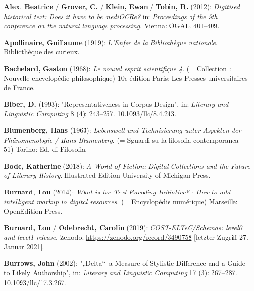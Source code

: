 \documentclass[
  12pt,
  letterpaper,
  DIV=11,
  numbers=noendperiod]{scrreprt}
\newlength{\cslhangindent}
\newenvironment{CSLReferences}[2] %
 {\begin{list}{}{%
  \setlength{\itemindent}{0pt}
  \setlength{\leftmargin}{0pt}
  \setlength{\parsep}{0pt}
  \ifodd #1
   \setlength{\leftmargin}{\cslhangindent}
   \setlength{\itemindent}{-1\cslhangindent}
  \fi
  \setlength{\itemsep}{#2\baselineskip}}}
 {\end{list}}
\begin{document}
\label{refs}
\begin{CSLReferences}{1}{0}
\textbf{Alex, Beatrice} / \textbf{Grover, C.} / \textbf{Klein, Ewan} /
\textbf{Tobin, R.} (2012): \emph{Digitised historical text: {Does} it
have to be {mediOCRe}?} in: \emph{Proceedings of the 9th conference on
the natural language processing}. Vienna: ÖGAL. 401--409.

\textbf{Apollinaire, Guillaume} (1919):
\emph{\href{https://fr.wikisource.org/wiki/Livre:Apollinaire_-_L\%E2\%80\%99Enfer_de_la_Biblioth\%C3\%A8que_nationale.djvu}{L'{Enfer}
de la {Bibliothèque} nationale}}. Bibliothèque des curieux.

\textbf{Bachelard, Gaston} (1968): \emph{Le nouvel esprit scientifique
4}. (= Collection : {Nouvelle} encyclopédie philosophique) 10e édition
Paris: Les Presses universitaires de France.

\textbf{Biber, D.} (1993): "Representativeness in {Corpus} {Design}",
in: \emph{Literary and Linguistic Computing} 8 (4): 243--257.
\href{https://doi.org/10.1093/llc/8.4.243}{10.1093/llc/8.4.243}.

\textbf{Blumenberg, Hans} (1963): \emph{Lebenswelt und {Technisierung}
unter {Aspekten} der {Phänomenologie} / {Hans} {Blumenberg}}. (= Sguardi
su la filosofia contemporanea 51) Torino: Ed. di Filosofia.

\textbf{Bode, Katherine} (2018): \emph{A {World} of {Fiction}: {Digital}
{Collections} and the {Future} of {Literary} {History}}. Illustrated
Edition University of Michigan Press.

\textbf{Burnard, Lou} (2014):
\emph{\href{http://books.openedition.org/oep/426}{What is the {Text}
{Encoding} {Initiative}? : {How} to add intelligent markup to digital
resources}}. (= Encyclopédie numérique) Marseille: OpenEdition Press.

\textbf{Burnard, Lou} / \textbf{Odebrecht, Carolin} (2019):
\emph{{COST}-{ELTeC}/{Schemas}: level0 and level1 release}. Zenodo.
\url{https://zenodo.org/record/3490758} {[}letzter Zugriff 27. Januar
2021{]}.

\textbf{Burrows, John} (2002): "{„{Delta}``}: a {Measure} of {Stylistic}
{Difference} and a {Guide} to {Likely} {Authorship}", in: \emph{Literary
and Linguistic Computing} 17 (3): 267--287.
\href{https://doi.org/10.1093/llc/17.3.267}{10.1093/llc/17.3.267}.


\end{CSLReferences}
\end{document}
